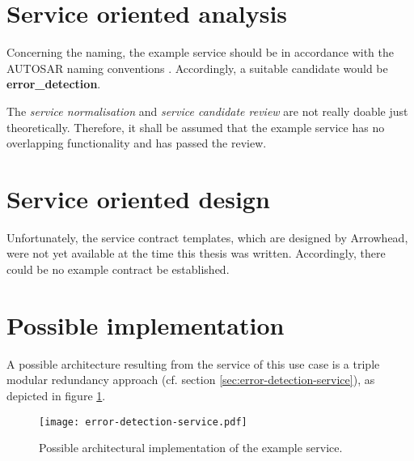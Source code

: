 \section{Service oriented analysis}


Concerning the naming, the example service should be in accordance with the AUTOSAR naming conventions \cite{autosar_system_modelling}. Accordingly, a suitable candidate would be \textbf{error\_detection}.

The \emph{service normalisation} and \emph{service candidate review} are not really doable just theoretically. Therefore, it shall be assumed that the example service has no overlapping functionality and has passed the review.





\section{Service oriented design}

Unfortunately, the service contract templates, which are designed by Arrowhead, were not yet available at the time this thesis was written. Accordingly, there could be no example contract be established.


\section{Possible implementation}

A possible architecture resulting from the service of this use case is a triple modular redundancy approach (cf. section \ref{sec:error-detection-service}), as depicted in figure \ref{fig:example-service-architecture}. 


\begin{figure}[ht]
\centering
\texttt{[image: error-detection-service.pdf]}
\caption{Possible architectural implementation of the example service.}
\label{fig:example-service-architecture}
\end{figure}